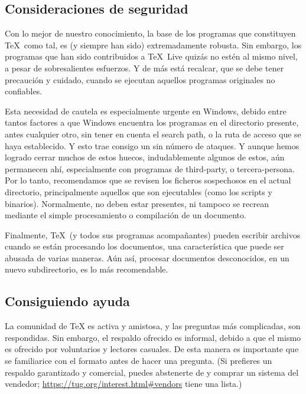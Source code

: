 \documentclass{article}
\begin{document}
\subsection{Consideraciones de seguridad}
\label{sec:security}

Con lo mejor de nuestro conocimiento, la base de los programas
que constituyen  \TeX\ como tal, es (y siempre han sido)
extremadamente robusta. Sin embargo, los programas que han sido
contribuidos a \TeX\ Live quizás no estén al mismo nivel, a
pesar de sobresalientes esfuerzos. Y de más está recalcar, que
se debe tener precaución y cuidado, cuando se ejecutan
aquellos programas originales no confiables. 

Esta necesidad de cautela es especialmente urgente en Windows, debido
entre tantos factores a que Windows encuentra los programas en el
directorio presente, antes cualquier otro, sin tener en cuenta el
search path, o la ruta de acceso que se haya establecido. Y esto trae
consigo un sin número de ataques. Y aunque hemos logrado cerrar muchos
de estos huecos, indudablemente algunos de estos, aún permanecen ahí,
especialmente con programas de third-party, o tercera-persona. Por lo
tanto, recomendamos que se revisen los ficheros sospechosos en el actual
directorio, principalmente aquellos que son ejecutables (como los
scripts y binarios). Normalmente, no deben estar presentes, ni tampoco
se recrean mediante el simple procesamiento o compilación de un
documento. 
  
Finalmente, \TeX\ (y todos sus programas acompañantes) pueden escribir
archivos cuando se están procesando los documentos, una característica
que puede ser abusada de varias maneras. Aún así, procesar documentos
desconocidos, en un nuevo subdirectorio, es lo más recomendable. 

\subsection{Consiguiendo ayuda}
\label{sec:help}

La comunidad de \TeX{} es activa y amistosa, y las preguntas más
complicadas, son respondidas. Sin embargo, el respaldo ofrecido es
informal, debido a que el mismo es ofrecido por voluntarios y lectores
casuales. De esta manera es importante que se familiarice con el
formato antes de hacer una pregunta. (Si prefieres un respaldo
garantizado y comercial, puedes abstenerte de \TL{} y comprar un
sistema del vendedor; \url{https://tug.org/interest.html#vendors} tiene
una lista.)
\end{document}
